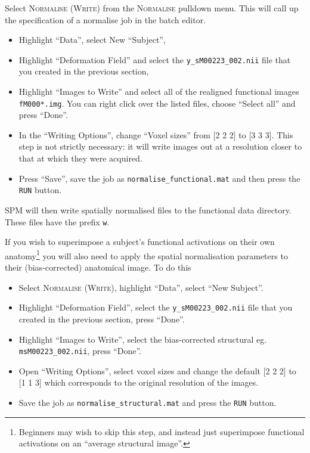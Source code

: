 Select \textsc{Normalise (Write)} from the \textsc{Normalise} pulldown menu. This will call up the specification of a normalise job in the batch editor. 

\begin{itemize}
\item Highlight ``Data'', select New ``Subject'',
\item Highlight ``Deformation Field'' and select the \texttt{y\_sM00223\_002.nii} file that you created in the previous section,
\item Highlight ``Images to Write'' and select all of the realigned functional images \texttt{fM000*.img}. You can right click over the listed files, choose ``Select all'' and press ``Done''.
\item In the ``Writing Options'', change ``Voxel sizes'' from [2 2 2] to [3 3 3]. This step is not strictly necessary: it will write images out at a resolution closer to that at which they were acquired.
\item Press ``Save'', save the job as \texttt{normalise\_functional.mat} and then press the \texttt{RUN} button.
\end{itemize}

SPM will then write spatially normalised files to the functional data directory. These files have the prefix \texttt{w}.

If you wish to superimpose a subject's functional activations on their own anatomy\footnote{Beginners may wish to skip this step, and instead just superimpose functional activations on an ``average structural image''.} you will also need to apply the spatial normalisation parameters to their (bias-corrected) anatomical image. To do this

\begin{itemize}
\item Select \textsc{Normalise (Write)}, highlight ``Data'', select ``New Subject''.
\item Highlight ``Deformation Field'', select the  \texttt{y\_sM00223\_002.nii} file that you created in the previous section, press ``Done''.
\item Highlight ``Images to Write'', select the bias-corrected structural eg. \texttt{msM00223\_002.nii}, press ``Done''.
\item Open ``Writing Options'', select voxel sizes and change the default [2 2 2] to [1 1 3] which corresponds to the original resolution of the images.
\item Save the job as \texttt{normalise\_structural.mat} and press the \texttt{RUN} button.
\end{itemize}

